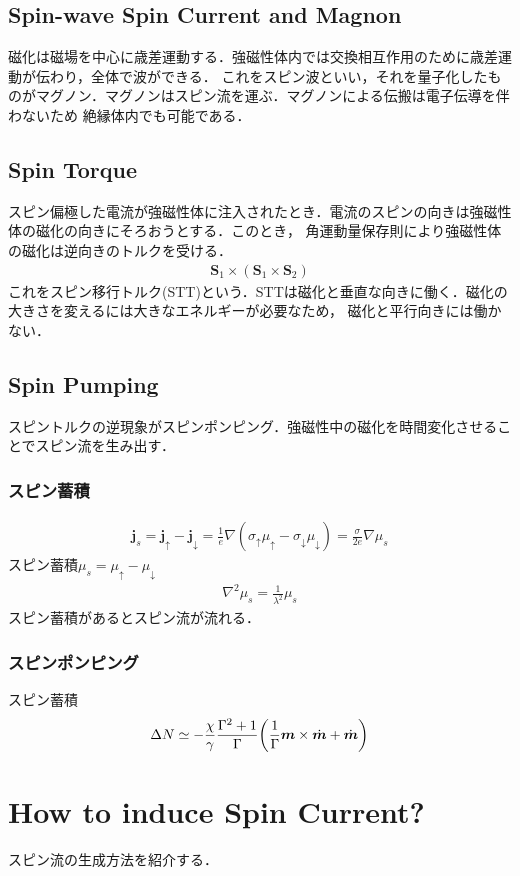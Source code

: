 \documentclass{ltjarticle}
\begin{document}
\subsection{Spin-wave Spin Current and Magnon}
磁化は磁場を中心に歳差運動する．強磁性体内では交換相互作用のために歳差運動が伝わり，全体で波ができる．
これをスピン波といい，それを量子化したものがマグノン．マグノンはスピン流を運ぶ．マグノンによる伝搬は電子伝導を伴わないため
絶縁体内でも可能である．
\subsection{Spin Torque}
スピン偏極した電流が強磁性体に注入されたとき．電流のスピンの向きは強磁性体の磁化の向きにそろおうとする．このとき，
角運動量保存則により強磁性体の磁化は逆向きのトルクを受ける．
\begin{align}
  \bm{S}_1 \times (\bm{S}_1\times \bm{S}_2)
\end{align}
これをスピン移行トルク(STT)という．STTは磁化と垂直な向きに働く．磁化の大きさを変えるには大きなエネルギーが必要なため，
磁化と平行向きには働かない．
\subsection{Spin Pumping}
スピントルクの逆現象がスピンポンピング．強磁性中の磁化を時間変化させることでスピン流を生み出す．
\subsubsection{スピン蓄積}
\begin{align}
  \bm{j}_s = \bm{j}_{\uparrow} - \bm{j}_{\downarrow} = \frac{1}{e}\nabla(\sigma_{\uparrow}\mu_{\uparrow} - \sigma_{\downarrow}\mu_{\downarrow}) = \frac{\sigma}{2e}\nabla\mu_{s}
\end{align}
スピン蓄積$\mu_s=\mu_{\uparrow}- \mu_{\downarrow}$
\begin{align}
  \nabla^2\mu_s=\frac{1}{\lambda^2}\mu_s
\end{align}
スピン蓄積があるとスピン流が流れる．
\subsubsection{スピンポンピング}
スピン蓄積
\begin{align}
  \Delta N \simeq -\frac{\chi}{\gamma}\frac{\Gamma^2 + 1}{\Gamma}\qty(\frac{1}{\Gamma}\bm{m}\times\dot{\bm{m}} + \dot{\bm{m}})
\end{align}
\section{How to induce Spin Current?}
スピン流の生成方法を紹介する．
\end{document}
